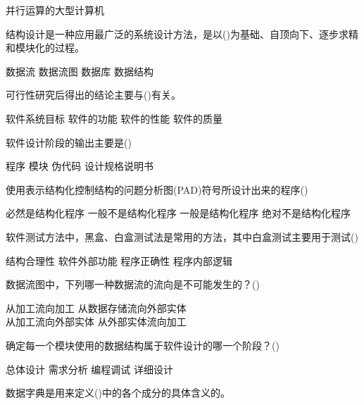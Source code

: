 \documentclass{exam}
\begin{document}
\begin{questions}
\begin{oneparchoices}
		\choice 并行运算的大型计算机
	\end{oneparchoices}
	\question 结构设计是一种应用最广泛的系统设计方法，是以()为基础、自顶向下、逐步求精和模块化的过程。\\
	\begin{oneparchoices}
		\choice 数据流
		\correctchoice 数据流图
		\choice 数据库
		\choice 数据结构
	\end{oneparchoices}
	\question 可行性研究后得出的结论主要与()有关。\\
	\begin{oneparchoices}
		\correctchoice 软件系统目标
		\choice 软件的功能
		\choice 软件的性能
		\choice 软件的质量
	\end{oneparchoices}
	\question 软件设计阶段的输出主要是()\\
	\begin{oneparchoices}
		\choice 程序
		\choice 模块
		\choice 伪代码
		\correctchoice 设计规格说明书
	\end{oneparchoices}
	\question 使用表示结构化控制结构的问题分析图(PAD)符号所设计出来的程序()\\
	\begin{oneparchoices}
		\correctchoice 必然是结构化程序
		\choice 一般不是结构化程序
		\choice 一般是结构化程序
		\choice 绝对不是结构化程序
	\end{oneparchoices}
	\question 软件测试方法中，黑盒、白盒测试法是常用的方法，其中白盒测试主要用于测试()\\
	\begin{oneparchoices}
		\choice 结构合理性
		\choice 软件外部功能
		\choice 程序正确性
		\correctchoice 程序内部逻辑
	\end{oneparchoices}
	\question 数据流图中，下列哪一种数据流的流向是不可能发生的？()\\
	\begin{oneparchoices}
		\choice 从加工流向加工
		\correctchoice 从数据存储流向外部实体\\
		\choice 从加工流向外部实体
		\choice 从外部实体流向加工
	\end{oneparchoices}
	\question 确定每一个模块使用的数据结构属于软件设计的哪一个阶段？()\\
	\begin{oneparchoices}
		\choice 总体设计
		\choice 需求分析
		\choice 编程调试
		\correctchoice 详细设计
	\end{oneparchoices}
	\question 数据字典是用来定义()中的各个成分的具体含义的。\\
	\begin{oneparchoices}

\end{oneparchoices}
\end{questions}
\end{document}
